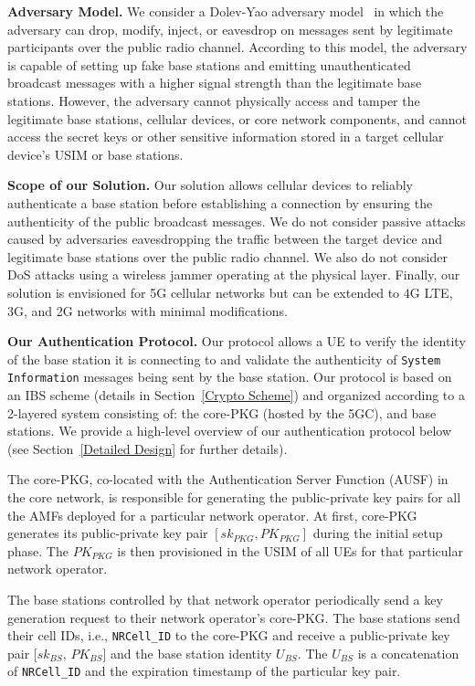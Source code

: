 \noindent \textbf{Adversary Model.}
We consider a Dolev-Yao adversary model~\cite{dolev1983security} in which the adversary can drop, modify, inject, or eavesdrop on messages sent by legitimate participants over the public radio channel. 
According to this model, the adversary is capable of setting up fake base stations and emitting unauthenticated broadcast messages with a higher signal strength than the legitimate base stations. 
However, the adversary cannot physically access and tamper the legitimate base stations, cellular devices, or core network components, and cannot access the secret keys or other sensitive information stored in a target cellular device's USIM or base stations.

\noindent \textbf{Scope of our Solution.}
Our solution allows cellular devices to reliably authenticate a base station before establishing a connection
by ensuring the authenticity of the public broadcast messages. We do not consider passive attacks caused by adversaries eavesdropping the traffic between the target device and legitimate base stations over the public radio channel. We also do not consider DoS attacks using a wireless jammer operating at the physical layer. Finally, our solution is envisioned for 5G cellular networks but can be extended to 4G LTE, 3G, and 2G networks with minimal modifications. 

\noindent \textbf{Our Authentication Protocol.}
Our protocol allows a UE to verify the identity of the base station it is connecting to and validate the authenticity of \texttt{System Information} messages being sent by the base station. Our protocol is based on an IBS scheme (details in Section~\ref{Crypto Scheme}) and organized according to a 2-layered system consisting of:  the core-PKG (hosted by the 5GC),  and  base stations. We provide a high-level overview of our authentication protocol below (see Section~\ref{Detailed Design} for further details). 

The core-PKG, co-located with the Authentication Server Function (AUSF) in the core network, is responsible for generating the public-private key pairs for all the AMFs deployed for a particular network operator. 
At first, core-PKG generates its public-private key pair $[sk_{PKG}, PK_{PKG}]$ during the initial setup phase. The $PK_{PKG}$ is then provisioned in the USIM of all UEs for that particular network operator. 

The base stations controlled by that network operator periodically send a key generation request to their network operator's core-PKG. The base stations send their cell IDs, i.e., \texttt{NRCell\_ID} to the core-PKG and receive a public-private key pair [$sk_{BS}$, $PK_{BS}$] and the base station identity $U_{BS}$. The $U_{BS}$ is a concatenation of \texttt{NRCell\_ID} and the expiration timestamp of the particular key pair.

